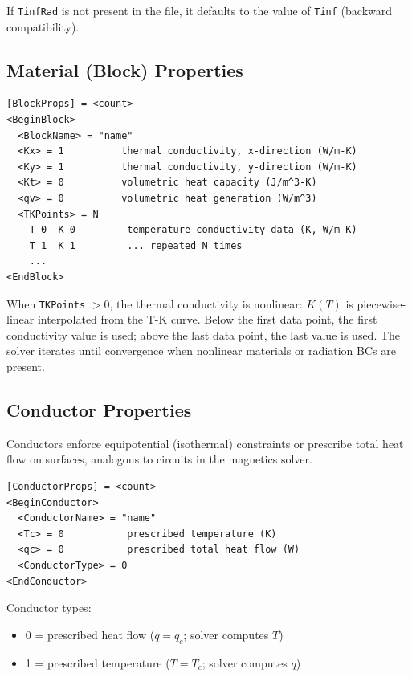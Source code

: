 \documentclass[11pt]{article}
\begin{document}
If \verb|TinfRad| is not present in the file, it defaults to the value
of \verb|Tinf| (backward compatibility).

\subsection{Material (Block) Properties}

\begin{lstlisting}
[BlockProps] = <count>
<BeginBlock>
  <BlockName> = "name"
  <Kx> = 1          thermal conductivity, x-direction (W/m-K)
  <Ky> = 1          thermal conductivity, y-direction (W/m-K)
  <Kt> = 0          volumetric heat capacity (J/m^3-K)
  <qv> = 0          volumetric heat generation (W/m^3)
  <TKPoints> = N
    T_0  K_0         temperature-conductivity data (K, W/m-K)
    T_1  K_1         ... repeated N times
    ...
<EndBlock>
\end{lstlisting}

When \verb|TKPoints| $> 0$, the thermal conductivity is nonlinear:
$K(T)$ is piecewise-linear interpolated from the T-K curve.  Below the
first data point, the first conductivity value is used; above the last
data point, the last value is used.  The solver iterates until
convergence when nonlinear materials or radiation BCs are present.

\subsection{Conductor Properties}

Conductors enforce equipotential (isothermal) constraints or prescribe
total heat flow on surfaces, analogous to circuits in the magnetics
solver.

\begin{lstlisting}
[ConductorProps] = <count>
<BeginConductor>
  <ConductorName> = "name"
  <Tc> = 0           prescribed temperature (K)
  <qc> = 0           prescribed total heat flow (W)
  <ConductorType> = 0
<EndConductor>
\end{lstlisting}

Conductor types:
\begin{itemize}[nosep]
  \item 0 = prescribed heat flow ($q = q_c$; solver computes $T$)
  \item 1 = prescribed temperature ($T = T_c$; solver computes $q$)
\end{itemize}
\end{document}
